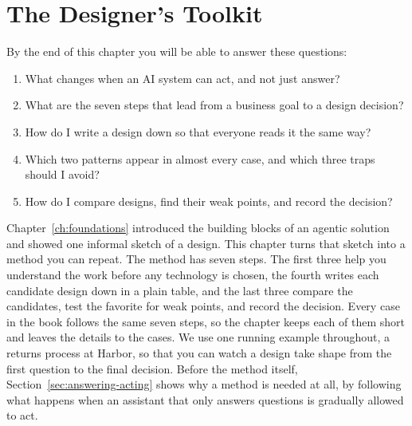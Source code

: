 
\chapter{The Designer's Toolkit}
\label{ch:toolkit}

\begin{chapterquestions}
By the end of this chapter you will be able to answer these questions:
\begin{enumerate}[leftmargin=*,itemsep=2pt]
  \item What changes when an AI system can act, and not just answer?
  \item What are the seven steps that lead from a business goal to a design decision?
  \item How do I write a design down so that everyone reads it the same way?
  \item Which two patterns appear in almost every case, and which three traps should I avoid?
  \item How do I compare designs, find their weak points, and record the decision?
\end{enumerate}
\end{chapterquestions}

Chapter~\ref{ch:foundations} introduced the building blocks of an agentic solution and showed one informal sketch of a design. This chapter turns that sketch into a method you can repeat. The method has seven steps. The first three help you understand the work before any technology is chosen, the fourth writes each candidate design down in a plain table, and the last three compare the candidates, test the favorite for weak points, and record the decision. Every case in the book follows the same seven steps, so the chapter keeps each of them short and leaves the details to the cases. We use one running example throughout, a returns process at Harbor, so that you can watch a design take shape from the first question to the final decision. Before the method itself, Section~\ref{sec:answering-acting} shows why a method is needed at all, by following what happens when an assistant that only answers questions is gradually allowed to act.

